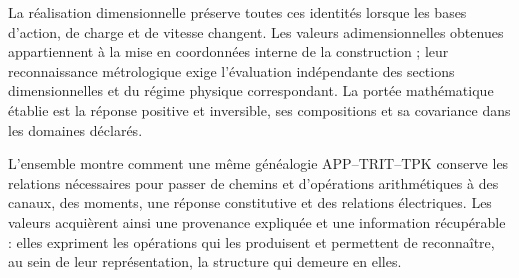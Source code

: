 La réalisation dimensionnelle préserve toutes ces identités lorsque
les bases d’action, de charge et de vitesse changent. Les valeurs
adimensionnelles obtenues appartiennent à la mise en coordonnées interne de la
construction ; leur reconnaissance métrologique exige l’évaluation
indépendante des sections dimensionnelles et du régime physique
correspondant. La portée mathématique établie est la réponse
positive et inversible, ses compositions et sa covariance dans les
domaines déclarés.

L’ensemble montre comment une même généalogie APP--TRIT--TPK conserve
les relations nécessaires pour passer de chemins et d’opérations
arithmétiques à des canaux, des moments, une réponse constitutive et des relations
électriques. Les valeurs acquièrent ainsi une provenance expliquée et
une information récupérable : elles expriment les opérations qui les
produisent et permettent de reconnaître, au sein de leur représentation, la
structure qui demeure en elles.
\par\endgroup
